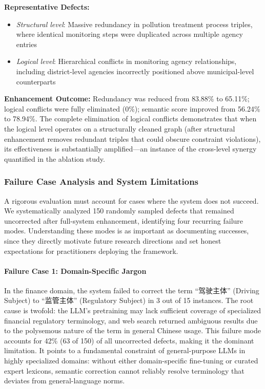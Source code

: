 \documentclass[runningheads]{llncs}
\begin{document}
\textbf{Representative Defects:}
\begin{itemize}
    \item \textit{Structural level}: Massive redundancy in pollution treatment process triples, where identical monitoring steps were duplicated across multiple agency entries
    \item \textit{Logical level}: Hierarchical conflicts in monitoring agency relationships, including district-level agencies incorrectly positioned above municipal-level counterparts
\end{itemize}

\textbf{Enhancement Outcome:} Redundancy was reduced from 83.88\% to 65.11\%; logical conflicts were fully eliminated (0\%); semantic score improved from 56.24\% to 78.94\%. The complete elimination of logical conflicts demonstrates that when the logical level operates on a structurally cleaned graph (after structural enhancement removes redundant triples that could obscure constraint violations), its effectiveness is substantially amplified—an instance of the cross-level synergy quantified in the ablation study.

\subsubsection{Failure Case Analysis and System Limitations}
\label{subsubsec:failure}

A rigorous evaluation must account for cases where the system does not succeed. We systematically analyzed 150 randomly sampled defects that remained uncorrected after full-system enhancement, identifying four recurring failure modes. Understanding these modes is as important as documenting successes, since they directly motivate future research directions and set honest expectations for practitioners deploying the framework.

\paragraph{Failure Case 1: Domain-Specific Jargon}
In the finance domain, the system failed to correct the term ``驾驶主体'' (Driving Subject) to ``监管主体'' (Regulatory Subject) in 3 out of 15 instances. The root cause is twofold: the LLM's pretraining may lack sufficient coverage of specialized financial regulatory terminology, and web search returned ambiguous results due to the polysemous nature of the term in general Chinese usage. This failure mode accounts for 42\% (63 of 150) of all uncorrected defects, making it the dominant limitation. It points to a fundamental constraint of general-purpose LLMs in highly specialized domains: without either domain-specific fine-tuning or curated expert lexicons, semantic correction cannot reliably resolve terminology that deviates from general-language norms.
\end{document}

